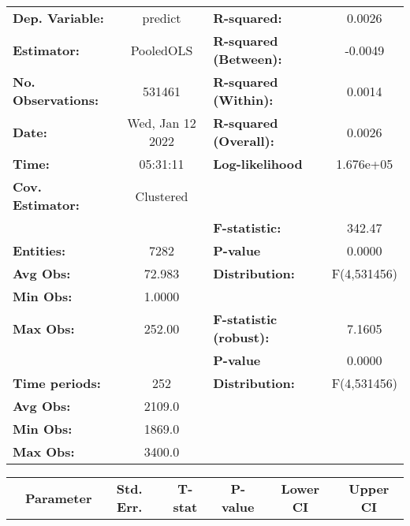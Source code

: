 \begin{center}
\begin{tabular}{lclc}
\toprule
\textbf{Dep. Variable:}    &      predict       & \textbf{  R-squared:         }   &      0.0026      \\
\textbf{Estimator:}        &     PooledOLS      & \textbf{  R-squared (Between):}  &     -0.0049      \\
\textbf{No. Observations:} &       531461       & \textbf{  R-squared (Within):}   &      0.0014      \\
\textbf{Date:}             &  Wed, Jan 12 2022  & \textbf{  R-squared (Overall):}  &      0.0026      \\
\textbf{Time:}             &      05:31:11      & \textbf{  Log-likelihood     }   &    1.676e+05     \\
\textbf{Cov. Estimator:}   &     Clustered      & \textbf{                     }   &                  \\
\textbf{}                  &                    & \textbf{  F-statistic:       }   &      342.47      \\
\textbf{Entities:}         &        7282        & \textbf{  P-value            }   &      0.0000      \\
\textbf{Avg Obs:}          &       72.983       & \textbf{  Distribution:      }   &   F(4,531456)    \\
\textbf{Min Obs:}          &       1.0000       & \textbf{                     }   &                  \\
\textbf{Max Obs:}          &       252.00       & \textbf{  F-statistic (robust):} &      7.1605      \\
\textbf{}                  &                    & \textbf{  P-value            }   &      0.0000      \\
\textbf{Time periods:}     &        252         & \textbf{  Distribution:      }   &   F(4,531456)    \\
\textbf{Avg Obs:}          &       2109.0       & \textbf{                     }   &                  \\
\textbf{Min Obs:}          &       1869.0       & \textbf{                     }   &                  \\
\textbf{Max Obs:}          &       3400.0       & \textbf{                     }   &                  \\
\bottomrule
\end{tabular}
\begin{tabular}{lcccccc}
                & \textbf{Parameter} & \textbf{Std. Err.} & \textbf{T-stat} & \textbf{P-value} & \textbf{Lower CI} & \textbf{Upper CI}  \\

\end{tabular}
\end{center}
